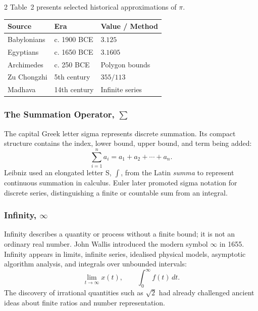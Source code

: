 \begin{multicols}{2}
  \needspace{140pt}
  Table~2 presents selected historical approximations of $\pi$.

\begin{center}
\vspace{-0.5em}
\begin{minipage}{0.98\columnwidth}
\centering
    \scriptsize
    \setlength{\tabcolsep}{3pt}
    \renewcommand{\arraystretch}{1.3}
    \begin{tabular}{@{}>{\RaggedRight\arraybackslash}p{}
                        >{\RaggedRight\arraybackslash}p{}
                        >{\RaggedRight\arraybackslash}p{}@{}}
      \toprule
      \textbf{Source} & \textbf{Era} & \textbf{Value / Method} \\
      \midrule
      Babylonians & c. 1900 BCE & $3.125$ \\
      Egyptians & c. 1650 BCE & $3.1605$ \\
      Archimedes & c. 250 BCE & Polygon bounds \\
      Zu Chongzhi & 5th century & $355/113$ \\
      Madhava & 14th century & Infinite series \\
      \bottomrule
    \end{tabular}
\end{minipage}
  \end{center}
\vspace{-0.35em}

  \subsubsection*{The Summation Operator, $\sum$}
  The capital Greek letter sigma represents discrete summation. Its compact structure contains the index, lower bound, upper bound, and term being added:
  \[
    \sum_{i=1}^{n}a_i=a_1+a_2+\cdots+a_n.
  \]
  Leibniz used an elongated letter S, $\int$, from the Latin \textit{summa} to represent continuous summation in calculus. Euler later promoted sigma notation for discrete series, distinguishing a finite or countable sum from an integral.

  \subsubsection*{Infinity, $\infty$}
  Infinity describes a quantity or process without a finite bound; it is not an ordinary real number. John Wallis introduced the modern symbol $\infty$ in 1655. Infinity appears in limits, infinite series, idealised physical models, asymptotic algorithm analysis, and integrals over unbounded intervals:
  \[
    \lim_{t\to\infty}x(t), \qquad
    \int_{0}^{\infty}f(t)\,dt.
  \]
  The discovery of irrational quantities such as $\sqrt{2}$ had already challenged ancient ideas about finite ratios and number representation.


\end{multicols}
